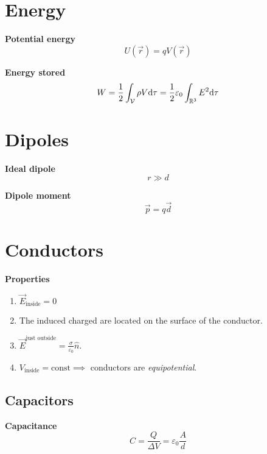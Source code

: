\documentclass[10pt]{extarticle}
\numberwithin{equation}{section}
\begin{document}
\begin{multicols}{2}
    \section{Energy}

    \textbf{Potential energy}
    \begin{equation}
        U(\vec r) = q V(\vec r)
    \end{equation}

    \textbf{Energy stored}
    \begin{equation}
        W = \frac{1}{2} \int_{\mathcal V} \rho V \dd \tau = \frac{1}{2} \varepsilon_0 \int_{\mathbb{R}^3} E^2 \dd \tau
    \end{equation}

    \section{Dipoles}

    \textbf{Ideal dipole}
    \begin{equation}
        r \gg d
    \end{equation}

    \textbf{Dipole moment}
    \begin{equation}
        \vec p = q \vec d
    \end{equation}

    \section{Conductors}

    \textbf{Properties}
    \begin{enumerate}
        \item $\vec E_\text{inside} = 0$
        \item The induced charged are located on the surface of the conductor.
        \item $\vec E^\text{just outside} = \frac{\sigma}{\varepsilon_0} \hat n$.
        \item $V_\text{inside} = \text{const} \implies$ conductors are \emph{equipotential}.
    \end{enumerate}

    \subsection{Capacitors}

    \textbf{Capacitance}
    \begin{equation}
        C = \frac{Q }{\Delta V} = \varepsilon_0 \frac{A}{d}
    \end{equation}


\end{multicols}
\end{document}
